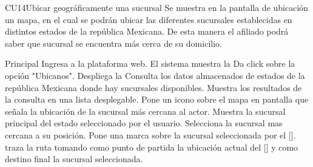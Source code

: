 
% 




\begin{UseCase}{CU14}{Ubicar geográficamente una sucursal}{
		Se muestra en la pantalla de ubicación un mapa, en el cual se podrán ubicar las diferentes sucursales establecidas en distintos estados de la república Mexicana. De esta manera el afiliado podrá saber que sucursal se encuentra más cerca de su domicilio.
	}
	\end{UseCase}

	\begin{UCtrayectoria}{Principal}
		\UCpaso[\UCactor] Ingresa a la plataforma web.
		\UCpaso El sistema muestra la 
		\UCpaso[\UCactor] Da click sobre la opción "Ubicanos".
		\UCpaso Despliega la 
		\UCpaso Consulta los datos almacenados de estados de la república Mexicana donde hay sucursales disponibles.
		\UCpaso Muestra los resultados de la consulta en una lista desplegable.
		\UCpaso Pone un icono sobre el mapa en pantalla que señala la ubicación de la sucursal más cercana al actor. 
		\UCpaso Muestra la sucursal principal del estado seleccionado por el usuario. \label{CU14MostarSuc}
		\UCpaso[\UCactor] Selecciona la sucursal mas cercana a su posición.
		\UCpaso Pone una marca sobre la sucursal seleccionada por el [\UCactor].
		\UCpaso traza la ruta tomando como punto de partida la ubicación actual del [\UCactor] y como destino final la sucursal seleccionada.
	\end{UCtrayectoria}

